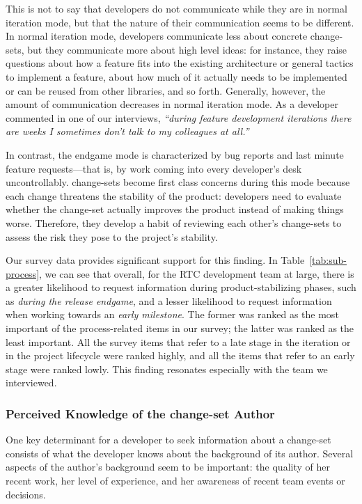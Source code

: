 This is not to say that developers do not communicate while they are in normal iteration  mode, but that the nature of their communication seems to be different. In normal iteration mode, developers communicate less about concrete change-sets, but they communicate more about high level ideas: for instance, they raise questions about how a feature fits into the existing architecture or general tactics to implement a feature, about how much of it actually needs to be implemented or can be reused from other libraries, and so forth. Generally, however, the amount of communication decreases in normal iteration mode. As a developer commented in one of our interviews, \emph{``during feature development iterations there are weeks I sometimes don't talk to my colleagues at all.''} 

In contrast, the endgame mode is characterized by bug reports and last minute feature requests---that is, by work coming into every developer's desk uncontrollably. change-sets become first class concerns during this mode because each change threatens the stability of the product: developers need to evaluate whether the change-set actually improves the product instead of making things worse. Therefore, they develop a habit of reviewing each other's change-sets to assess the risk they pose to the project's stability.

Our survey data provides significant support for this finding. In Table~\ref{tab:sub-process}, we can see that overall, for the RTC development team at large, there is a greater likelihood to request information during product-stabilizing phases, such as 
\emph{during the release endgame}, and a lesser likelihood to request information when working towards an \emph{early milestone}. The former was ranked as the most important of the process-related items in our survey; the latter was ranked as the least important. All the survey items that refer to a late stage in the iteration or in the project lifecycle were ranked highly, and all the items that refer to an early stage were ranked lowly. This finding resonates especially with the team we interviewed. 


\subsubsection{Perceived Knowledge of the change-set Author}
One key determinant for a developer to seek information about a change-set consists of what the developer knows about the background of its author. Several aspects of the author's background seem to be important: the quality of her recent work, her level of experience, and her awareness of recent team events or decisions.

